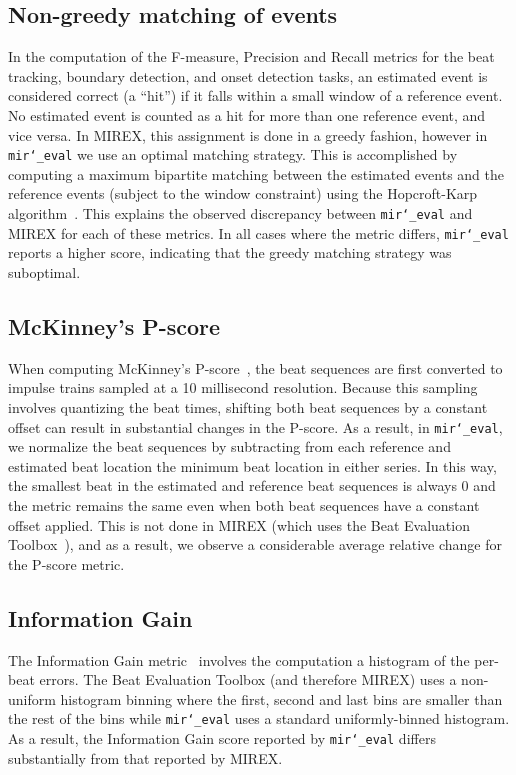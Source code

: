 \documentclass{article}
\def\mireval{\texttt{mir\char`_eval}}
\begin{document}
\subsection{Non-greedy matching of events}

In the computation of the F-measure, Precision and Recall metrics for the beat tracking, boundary detection, and onset detection tasks, an estimated event is considered correct (a ``hit'') if it falls within a small window of a reference event.
No estimated event is counted as a hit for more than one reference event, and vice versa.
In MIREX, this assignment is done in a greedy fashion, however in \mireval{} we use an optimal matching strategy.
This is accomplished by computing a maximum bipartite matching between the estimated events and the reference events (subject to the window constraint) using the Hopcroft-Karp algorithm~\cite{hopcroft1973n}.
This explains the observed discrepancy between \mireval{} and MIREX for each of these metrics.
In all cases where the metric differs, \mireval{} reports a higher score, indicating that the greedy matching strategy was suboptimal.

\subsection{McKinney's P-score}

When computing McKinney's P-score~\cite{davies2009evaluation}, the beat sequences are first converted to impulse trains sampled at a 10 millisecond resolution.
Because this sampling involves quantizing the beat times, shifting both beat sequences by a constant offset can result in substantial changes in the P-score.
As a result, in \mireval{}, we normalize the beat sequences by subtracting from each reference and estimated beat location the minimum beat location in either series.
In this way, the smallest beat in the estimated and reference beat sequences is always $0$ and the metric remains the same even when both beat sequences have a constant offset applied.
This is not done in MIREX (which uses the Beat Evaluation Toolbox~\cite{davies2009evaluation}), and as a result, we observe a considerable average relative change for the P-score metric.

\subsection{Information Gain}

The Information Gain metric~\cite{davies2009evaluation} involves the computation a histogram of the per-beat errors.
The Beat Evaluation Toolbox (and therefore MIREX) uses a non-uniform histogram binning where the first, second and last bins are smaller than the rest of the bins while \mireval{} uses a standard uniformly-binned histogram.
As a result, the Information Gain score reported by \mireval{} differs substantially from that reported by MIREX.
\end{document}
